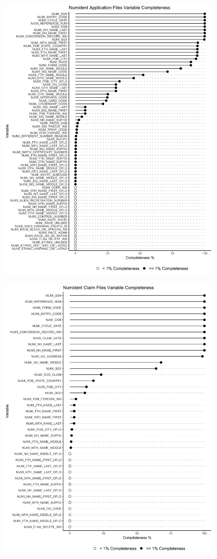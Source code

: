 \documentclass[
  11pt,
]{article}
\begin{document}
\begin{figure}
  \centering
  \includegraphics[width = 6.9in]{../illustrations/application_coverage.png}
  \caption{}
\end{figure}

\begin{figure}
  \centering
  \includegraphics[width=6.9in]{../illustrations/claim_coverage.png}
  \caption{}
\end{figure}

\newpage
\end{document}
